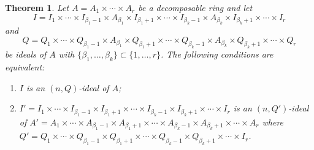 \documentclass[preprint,review,10pt]{amsart}
\newtheorem{theorem}{Theorem}[section]
\theoremstyle{definition}
\theoremstyle{remark}
\numberwithin{equation}{section}
\begin{document}
\begin{theorem} \label{6}
Let $A= A_1 \times \cdots \times A_r$ be a decomposable ring and let \[ I = I_1 \times \cdots \times I_{\beta_1-1} \times A_{\beta_1} \times I_{\beta_1+1} \times \cdots \times I_{\beta_k-1} \times A_{\beta_k} \times I_{\beta_k+1} \times \cdots \times I_r \] and \[ Q = Q_1 \times \cdots \times Q_{\beta_1-1} \times A_{\beta_1} \times Q_{\beta_1+1} \times \cdots \times Q_{\beta_k-1} \times A_{\beta_k} \times Q_{\beta_k+1} \times \cdots \times Q_r \]be   ideals of $A$ with    $\{\beta_1, \dots, \beta_k\} \subset \{1, \dots, r\}$.  The following conditions are equivalent:
 \begin{enumerate} 
 \item[(1)] $I$ is an $(n,Q)$-ideal of $A$; 
 \item[(2)] $I'  = I_1 \times \cdots \times I_{\beta_1-1} \times I_{\beta_1+1} \times \cdots \times I_{\beta_k-1} \times I_{\beta_k+1} \times \cdots \times I_r$ is an $(n,Q')$-ideal of $A' =A_1 \times \cdots \times A_{\beta_1-1} \times A_{\beta_1+1} \times \cdots \times A_{\beta_k-1} \times A_{\beta_k+1} \times \cdots \times A_r$ where $Q'=Q_1 \times \cdots \times Q_{\beta_1-1} \times Q_{\beta_1+1} \times \cdots \times Q_{\beta_k-1} \times Q_{\beta_k+1} \times \cdots \times I_r$.
  \end{enumerate}
\end{theorem}
\end{document}
